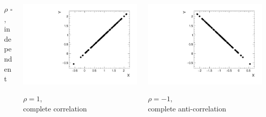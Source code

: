\documentclass[9pt]{beamer}
\begin{document}
\begin{frame}
\begin{columns}
\begin{column}{0.27\textwidth}
   \centering
   $\rho=0$,\\ independent
  \end{column}
  \begin{column}{0.27\textwidth}
   \includegraphics[width=\textwidth]{cor}
   
   \centering
   $\rho=1$,\\ complete correlation
  \end{column}
  \begin{column}{0.27\textwidth}
   \includegraphics[width=\textwidth]{anticor}
   
   \centering
   $\rho=-1$,\\ complete anti-correlation
  \end{column}
 \end{columns}


\end{frame}
\end{document}

